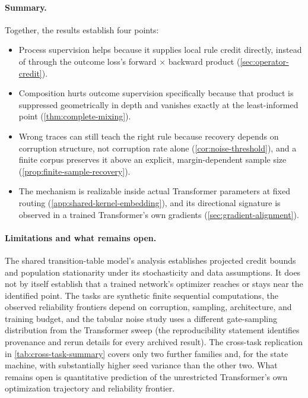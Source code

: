 \paragraph{Summary.} Together, the results establish four points:
\begin{itemize}[leftmargin=*,itemsep=1pt,topsep=2pt]
 \item Process supervision helps because it supplies local rule credit
 directly, instead of through the outcome loss's forward $\times$ backward
 product (\cref{sec:operator-credit}).
 \item Composition hurts outcome supervision specifically because that
 product is suppressed geometrically in depth and vanishes exactly at the
 least-informed point (\cref{thm:complete-mixing}).
 \item Wrong traces can still teach the right rule because recovery
 depends on corruption structure, not corruption rate alone
 (\cref{cor:noise-threshold}), and a finite corpus preserves it above an
 explicit, margin-dependent sample size (\cref{prop:finite-sample-recovery}).
 \item The mechanism is realizable inside actual Transformer parameters at
 fixed routing (\cref{app:shared-kernel-embedding}), and its directional
 signature is observed in a trained Transformer's own gradients
 (\cref{sec:gradient-alignment}).
\end{itemize}

\paragraph{Limitations and what remains open.}
The shared transition-table model's analysis establishes projected credit
bounds and population stationarity under its stochasticity and data
assumptions. It does not by itself establish that a trained network's
optimizer reaches or stays near the identified point. The tasks are
synthetic finite sequential computations, the observed reliability
frontiers depend on corruption, sampling, architecture, and training
budget, and the tabular noise study uses a different gate-sampling
distribution from the Transformer sweep (the reproducibility statement
identifies provenance and rerun details for every archived result). The
cross-task replication in \cref{tab:cross-task-summary} covers only two
further families and, for the state machine, with substantially higher
seed variance than the other two. What remains open is quantitative
prediction of the unrestricted Transformer's own optimization trajectory
and reliability frontier.
